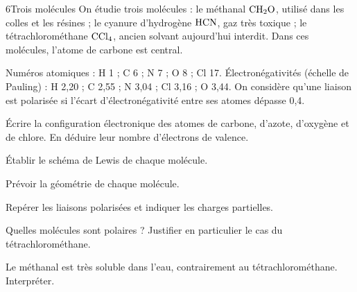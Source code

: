\begin{exoBac}{6}{Trois molécules}
On étudie trois molécules : le méthanal $\ce{CH2O}$, utilisé dans les colles et les résines ; le cyanure d'hydrogène $\ce{HCN}$, gaz très
toxique ; le tétrachlorométhane $\ce{CCl4}$, ancien solvant aujourd'hui interdit. Dans ces molécules, l'atome de carbone est central.
\begin{donnees}
Numéros atomiques : H 1 ; C 6 ; N 7 ; O 8 ; Cl 17. Électronégativités (échelle de Pauling) : H 2,20 ; C 2,55 ; N 3,04 ; Cl 3,16 ;
O 3,44. On considère qu'une liaison est polarisée si l'écart d'électronégativité entre ses atomes dépasse 0,4.
\end{donnees}
\begin{questions}
\item Écrire la configuration électronique des atomes de carbone, d'azote, d'oxygène et de chlore. En déduire leur nombre
d'électrons de valence.
\item Établir le schéma de Lewis de chaque molécule.
\item Prévoir la géométrie de chaque molécule.
\item Repérer les liaisons polarisées et indiquer les charges partielles.
\item Quelles molécules sont polaires ? Justifier en particulier le cas du tétrachlorométhane.
\item Le méthanal est très soluble dans l'eau, contrairement au tétrachlorométhane. Interpréter.
\end{questions}
\end{exoBac}

